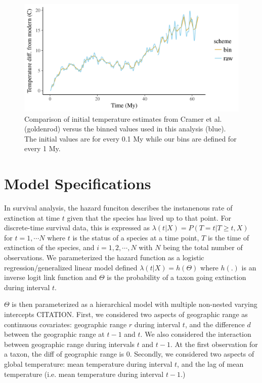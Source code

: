 \documentclass[12pt,letterpaper]{article}
\begin{document}
\begin{figure}[ht]
  \centering
  \includegraphics[width=\textwidth,height=\0.5textheight,keepaspectratio=true]{figure/cramer_temp}
  \caption{Comparison of initial temperature estimates from Cramer et al. (goldenrod) versus the binned values used in this analysis (blue). The initial values are for every 0.1 My while our bins are defined for every 1 My.}
  \label{fig:temp_curve}
\end{figure}


\section{Model Specifications}

In survival analysis, the hazard funciton describes the instanenous rate of extinction at time \(t\) given that the species has lived up to that point. For discrete-time survival data, this is expressed as \(\lambda(t | X) = P(T = t | T \geq t, X)\) for \(t = 1, \cdots N\) where \(t\) is the status of a species at a time point, \(T\) is the time of extinction of the species, and \(i = 1, 2, \cdots, N\) with \(N\) being the total number of observations. We parameterized the hazard function as a logistic regression/generalized linear model defined \(\lambda(t | X) = h(\Theta)\) where \(h(.)\) is an inverse logit link function and \(\Theta\) is the probability of a taxon going extinction during interval \(t\). 

\(\Theta\) is then parameterized as a hierarchical model with multiple non-nested varying intercepts CITATION. First, we considered two aspects of geographic range as continuous covariates: geographic range \(r\) during interval \(t\), and the difference \(d\) between the geographic range at \(t - 1\) and \(t\). We also considered the interaction between geographic range during intervals \(t\) and \(t - 1\). At the first observation for a taxon, the diff of geographic range is 0. Secondly, we considered two aspects of global temperature: mean temperature during interval \(t\), and the lag of mean temperature (i.e. mean temperature during interval \(t - 1\).)
\end{document}
